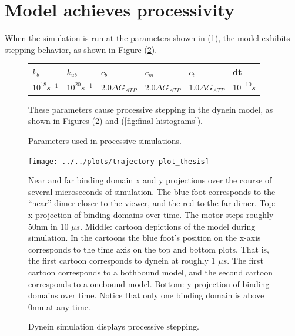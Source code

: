 \documentclass[
11pt, %
english, %
singlespacing, %
headsepline, %
chapterinoneline, %
]{MastersDoctoralThesis} %
\begin{document}

\section{Model achieves processivity}
When the simulation is run at the parameters shown in (\ref{table:thesis-parameters}), the model exhibits stepping behavior, as shown in Figure (\ref{fig:stepping-trajectory}).\\

\begin{figure}[h]
  \centering
  \begin{tabular}{| l | l | l | l | l | l |}
    \hline
    $k_{b}$ & $k_{ub}$ & $c_b$ &  $c_m$ & $c_t$ & dt\\\hline
    $10^{18} s^{-1}$ & $10^{20} s^{-1}$ & $2.0\Delta G_{ATP}$ & $2.0\Delta G_{ATP}$ & $1.0\Delta G_{ATP}$ & $10^{-10}s$\\ \hline
  \end{tabular}
  \caption{Parameters used in processive simulations.}{These parameters cause processive stepping in the dynein model, as shown in Figures (\ref{fig:stepping-trajectory}) and (\ref{fig:final-histograms}).}
  \label{table:thesis-parameters}
\end{figure}

\begin{figure}[h]
  \centering
  \texttt{[image: ../../plots/trajectory-plot\_thesis]}
  \caption{Dynein simulation displays processive stepping.}{Near and far binding domain x and y projections over the course of several microseconds of simulation. The blue foot corresponds to the ``near'' dimer closer to the viewer, and the red to the far dimer. Top: x-projection of binding domains over time. The motor steps roughly 50nm in 10 $\mu s$. Middle: cartoon depictions of the model during simulation. In the cartoons the blue foot's position on the x-axis corresponds to the time axis on the top and bottom plots. That is, the first cartoon corresponds to dynein at roughly 1 $\mu s$. The first cartoon corresponds to a bothbound model, and the second cartoon corresponds to a onebound model. Bottom: y-projection of binding domains over time. Notice that only one binding domain is above 0nm at any time.}
  \label{fig:stepping-trajectory}
\end{figure}
\end{document}
